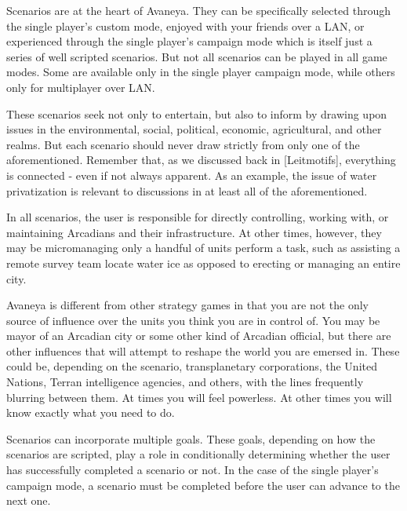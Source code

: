 

Scenarios are at the heart of Avaneya. They can be specifically selected through the single player's custom mode, enjoyed with your friends over a LAN, or experienced through the single player's campaign mode which is itself just a series of well scripted scenarios. But not all scenarios can be played in all game modes. Some are available only in the single player campaign mode, while others only for multiplayer over LAN.

These scenarios seek not only to entertain, but also to inform by drawing upon issues in the environmental, social, political, economic, agricultural, and other realms. But each scenario should never draw strictly from only one of the aforementioned. Remember that, as we discussed back in [Leitmotifs], everything is connected - even if not always apparent. As an example, the issue of water privatization is relevant to discussions in at least all of the aforementioned.

In all scenarios, the user is responsible for directly controlling, working with, or maintaining Arcadians and their infrastructure. At other times, however, they may be micromanaging only a handful of units perform a task, such as assisting a remote survey team locate water ice as opposed to erecting or managing an entire city.

Avaneya is different from other strategy games in that you are not the only source of influence over the units you think you are in control of. You may be mayor of an Arcadian city or some other kind of Arcadian official, but there are other influences that will attempt to reshape the world you are emersed in. These could be, depending on the scenario, transplanetary corporations, the United Nations, Terran intelligence agencies, and others, with the lines frequently blurring between them. At times you will feel powerless. At other times you will know exactly what you need to do.

Scenarios can incorporate multiple goals. These goals, depending on how the scenarios are scripted, play a role in conditionally determining whether the user has successfully completed a scenario or not. In the case of the single player's campaign mode, a scenario must be completed before the user can advance to the next one.

